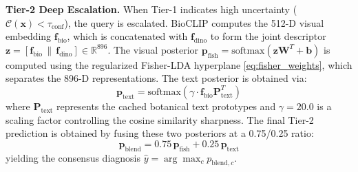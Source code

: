 \documentclass[conference]{IEEEtran}
\begin{document}
\medskip
\textbf{Tier-2 Deep Escalation.} When Tier-1 indicates high uncertainty ($\mathcal{C}(\mathbf{x}) < \tau_{\text{conf}}$), the query is escalated. BioCLIP computes the 512-D visual embedding $\mathbf{f}_{\text{bio}}$, which is concatenated with $\mathbf{f}_{\text{dino}}$ to form the joint descriptor $\mathbf{z} = [\mathbf{f}_{\text{bio}} \,\|\, \mathbf{f}_{\text{dino}}] \in \mathbb{R}^{896}$. The visual posterior $\mathbf{p}_{\text{fish}} = \text{softmax}\left(\mathbf{z} \mathbf{W}^T + \mathbf{b}\right)$ is computed using the regularized Fisher-LDA hyperplane \eqref{eq:fisher_weights}, which separates the 896-D representations. The text posterior is obtained via:
\begin{equation}
    \mathbf{p}_{\text{text}} = \text{softmax}\left(\gamma \cdot \mathbf{f}_{\text{bio}} \mathbf{P}_{\text{text}}^T\right)
\end{equation}
where $\mathbf{P}_{\text{text}}$ represents the cached botanical text prototypes and $\gamma = 20.0$ is a scaling factor controlling the cosine similarity sharpness. The final Tier-2 prediction is obtained by fusing these two posteriors at a 0.75/0.25 ratio:
\begin{equation}
    \label{eq:multimodal_blend}
    \mathbf{p}_{\text{blend}} = 0.75 \, \mathbf{p}_{\text{fish}} + 0.25 \, \mathbf{p}_{\text{text}}
\end{equation}
yielding the consensus diagnosis $\hat{y} = \arg\max_c p_{\text{blend}, c}$.
\end{document}
